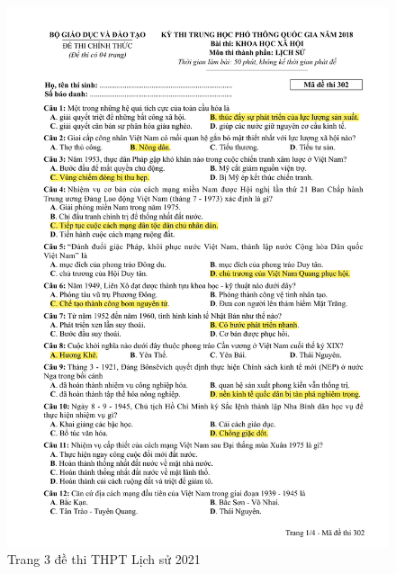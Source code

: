 \begin{figure}[htbp]
    \centering
    \includegraphics[width=1\textwidth, page=3]{Appendix/Fig/2018_302.pdf}
    \caption{Trang 3 đề thi THPT Lịch sử 2021}
\end{figure}

